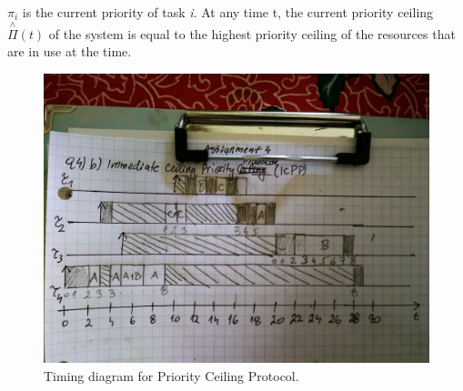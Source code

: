 \documentclass[10pt,a4paper]{article}
\begin{document}
$\pi_i$ is the current priority of task \textit{i}.
At any time t, the current priority ceiling $\overset{\mathrm{\wedge}}{\Pi}(t)$ of the system is equal to the highest priority ceiling of the resources that are in use at the time.

\begin{figure}[h]
\includegraphics[width=\linewidth]{4a.pdf}
\caption{Timing diagram for Priority Ceiling Protocol.} 
\label{fig:4a}
\end{figure}
\end{document}
